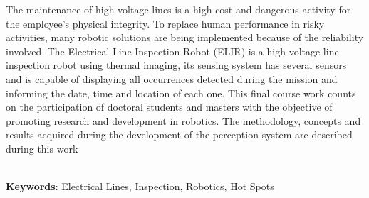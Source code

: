 \begin{thesisabastract}
The maintenance of high voltage lines is a high-cost and dangerous activity for the employee's physical integrity. To replace human performance in risky activities, many robotic solutions are being implemented because of the reliability involved. The  Electrical Line Inspection Robot (ELIR) is a high voltage line inspection robot using thermal imaging, its sensing system has several sensors and is capable of displaying all occurrences detected during the mission and informing the date, time and location of each one. This final course work counts on the participation of doctoral students and masters with the objective of promoting research and development in robotics. The methodology, concepts and results acquired during the development of the perception system are described during this work

\ \\


\textbf{Keywords}: Electrical Lines, Inspection, Robotics, Hot Spots

\end{thesisabastract}

